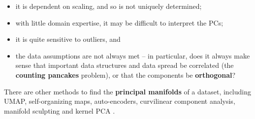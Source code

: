 \begin{itemize}[noitemsep]
\item it is dependent on scaling, and so is not uniquely determined;
\item with little domain expertise, it may be difficult to interpret the PCs;
\item it is quite sensitive to outliers, and 
\item the data assumptions are not always met -- in particular, does it always make sense that important data structures and data spread be correlated (the \textbf{counting pancakes} problem), or that the components be \textbf{orthogonal}?
\end{itemize} 
There are other methods to find the \textbf{principal manifolds} of a dataset, including UMAP, self-organizing maps, auto-encoders, curvilinear component analysis, manifold sculpting and kernel PCA \cite{DSML_FS6}. 
